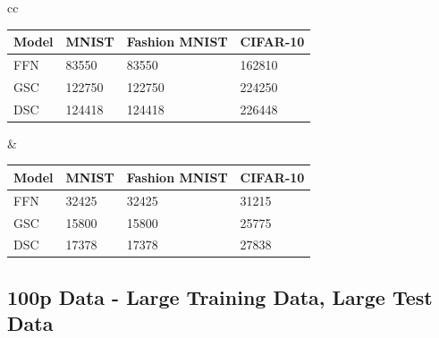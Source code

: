 \documentclass{article}
\begin{document}
\begin{tabular}{cc}
    \begin{minipage}{.5\linewidth}
\centering
\begin{tabular}{@{}llll@{}}
\toprule
\textbf{Model} & \textbf{MNIST} & \textbf{Fashion MNIST} & \textbf{CIFAR-10} \\ \midrule
FFN            & 83550          & 83550                  & 162810            \\
GSC            & 122750         & 122750                 & 224250            \\
DSC            & 124418         & 124418                 & 226448            \\ \bottomrule
\end{tabular}
\label{tab:my-table}
    \end{minipage} &
    \begin{minipage}{.5\linewidth}
    \centering
    \begin{tabular}{@{}llll@{}}
\toprule
\textbf{Model} & \textbf{MNIST} & \textbf{Fashion MNIST} & \textbf{CIFAR-10} \\ \midrule
FFN            & 32425          & 32425                  & 31215             \\
GSC            & 15800          & 15800                  & 25775             \\
DSC            & 17378          & 17378                  & 27838             \\ \bottomrule
\end{tabular}
\label{tab:my-table}
    \end{minipage} 
\end{tabular}


\subsection{100p Data - Large Training Data, Large Test Data}
\end{document}
